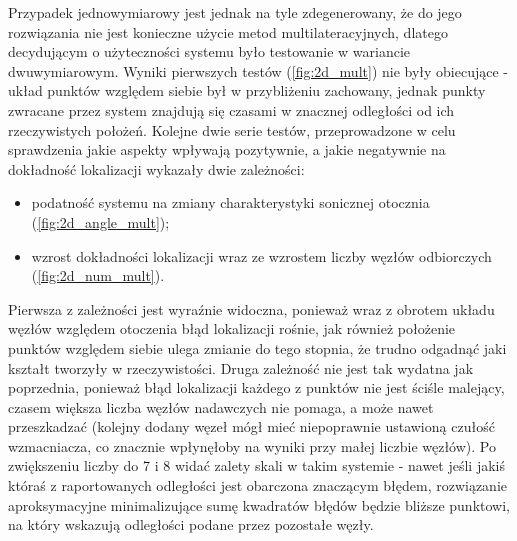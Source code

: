 Przypadek jednowymiarowy jest jednak na tyle zdegenerowany, że do jego rozwiązania nie jest konieczne użycie metod multilateracyjnych, dlatego decydującym o użyteczności systemu było testowanie w wariancie dwuwymiarowym. Wyniki pierwszych testów (\ref{fig:2d_mult}) nie były obiecujące {-} układ punktów względem siebie był w przybliżeniu zachowany, jednak punkty zwracane przez system znajdują się czasami w znacznej odległości od ich rzeczywistych położeń. Kolejne dwie serie testów, przeprowadzone w celu sprawdzenia jakie aspekty wpływają pozytywnie, a jakie negatywnie na dokładność lokalizacji wykazały dwie zależności:
\begin{itemize}
    \item podatność systemu na zmiany charakterystyki sonicznej otocznia (\ref{fig:2d_angle_mult});
    \item wzrost dokładności lokalizacji wraz ze wzrostem liczby węzłów odbiorczych (\ref{fig:2d_num_mult}).
\end{itemize}
Pierwsza z zależności jest wyraźnie widoczna, ponieważ wraz z obrotem układu węzłów względem otoczenia błąd lokalizacji rośnie, jak również położenie punktów względem siebie ulega zmianie do tego stopnia, że trudno odgadnąć jaki kształt tworzyły w rzeczywistości. Druga zależność nie jest tak wydatna jak poprzednia, ponieważ błąd lokalizacji każdego z punktów nie jest ściśle malejący, czasem większa liczba węzłów nadawczych nie pomaga, a może nawet przeszkadzać (kolejny dodany węzeł mógł mieć niepoprawnie ustawioną czułość wzmacniacza, co znacznie wpłynęłoby na wyniki przy małej liczbie węzłów). Po zwiększeniu liczby do 7 i 8 widać zalety skali w takim systemie {-} nawet jeśli jakiś któraś z raportowanych odległości jest obarczona znaczącym błędem, rozwiązanie aproksymacyjne minimalizujące sumę kwadratów błędów będzie bliższe punktowi, na który wskazują odległości podane przez pozostałe węzły.
